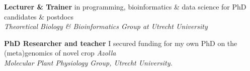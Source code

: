 \documentclass[a4paper,10pt]{article}
\begin{document}
{\begin{adjustbox}{valign=t}
\begin{minipage}[t]{0.3\textwidth}

\end{minipage}%
\end{adjustbox}%
\hfill%


\begin{adjustbox}{valign=t}
\hfill%
\begin{minipage}[t]{0.05\textwidth}
\MyVerticalRule
\end{minipage}%
\end{adjustbox}

\begin{adjustbox}{valign=t}
\hfill%
\begin{minipage}[t]{0.6\textwidth}


\begin{description}
\raggedright
\item[\normalfont \textcolor{ForestGreen}{\textbf{2022 -- now.}}] \textbf{Lecturer \&  Trainer} in programming, bioinformatics \& data science for PhD candidates \& postdocs \\
\textit{Theoretical Biology \& Bioinformatics Group at Utrecht University}
\item[\normalfont \textcolor{ForestGreen}{\textbf{2017 -- 2022.}}] \textbf{PhD Researcher and teacher} I secured funding for my own PhD on the (meta)genomics of novel crop \textit{Azolla} \\ 
\textit{Molecular Plant Physiology Group, Utrecht University.}
\end{description}


\end{minipage}
\end{adjustbox}}
\end{document}
